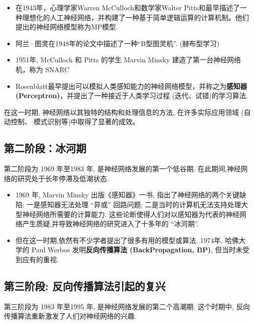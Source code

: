 \begin{itemize}
\item   在1943年，心理学家Warren McCulloch和数学家Walter Pitts和最早描述了一种理想化的人工神经网络，并构建了一种基于简单逻辑运算的计算机制。他们提出的神经网络模型称为MP模型.
\item 阿兰·图灵在1948年的论文中描述了一种“B型图灵机”. (赫布型学习)
\item 1951年, McCulloch 和 Pitts 的学生 Marvin Minsky 建造了第一台神经网络机，称为 SNARC 
\item Rosenblatt\cite{ROSENBLATT1958}最早提出可以模拟人类感知能力的神经网络模型，并称之为\textbf{感知器 (Perceptron)}，并提出了一种接近于人类学习过程 (迭代、试错)的学习算法.
  
  \end{itemize}

在这一时期, 神经网络以其独特的结构和处理信息的方法, 在许多实际应用领域 (自动控制、 模式识别等)中取得了显著的成效。

\subsection{第二阶段：冰河期}

第二阶段为 1969 年至1983 年, 是神经网络发展的第一个低谷期. 在此期间,神经网络的研究处于长年停滞及低潮状态.
\begin{itemize}
\item 1969 年, Marvin Minsky 出版《感知器》一书, 指出了神经网络的两个关键缺陷: 一是感知器无法处理 “异或” 回路问题; 二是当时的计算机无法支持处理大型神经网络所需要的计算能力. 这些论断使得人们对以感知器为代表的神经网络产生质疑,并导致神经网络的研究进入了十多年的 “冰河期”.
\item 但在这一时期,依然有不少学者提出了很多有用的模型或算法. 1974年, 哈佛大学的 Paul Werbos 发明\textbf{反向传播算法 (BackPropagation, BP)}\cite{Werbos1974}, 但当时未受到应有的重视.
\end{itemize}

\subsection{第三阶段: 反向传播算法引起的复兴}

第三阶段为 1983 年至1995 年, 是神经网络发展的第二个高潮期. 这个时期中, 反向传播算法重新激发了人们对神经网络的兴趣.

